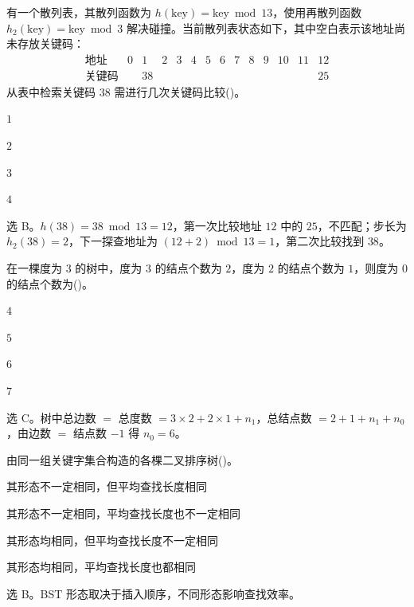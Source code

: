 \begin{question}
有一个散列表，其散列函数为 $h(\mathrm{key})=\mathrm{key}\bmod 13$，使用再散列函数 $h_2(\mathrm{key})=\mathrm{key}\bmod 3$ 解决碰撞。当前散列表状态如下，其中空白表示该地址尚未存放关键码：
\[
\begin{array}{c|ccccccccccccc}
\text{地址} &0&1&2&3&4&5&6&7&8&9&10&11&12\\ \hline
\text{关键码} &&38&&&&&&&&&&&25
\end{array}
\]
从表中检索关键码 $38$ 需进行几次关键码比较(\quad)。
\begin{choiceoptions}[1]
  \item $1$
  \item $2$
  \item $3$
  \item $4$
\end{choiceoptions}
\begin{solution}
选 B。$h(38)=38\bmod13=12$，第一次比较地址 $12$ 中的 $25$，不匹配；步长为 $h_2(38)=2$，下一探查地址为 $(12+2)\bmod13=1$，第二次比较找到 $38$。
\end{solution}
\end{question}


\begin{question}
在一棵度为 $3$ 的树中，度为 $3$ 的结点个数为 $2$，度为 $2$ 的结点个数为 $1$，则度为 $0$ 的结点个数为(\quad)。
\begin{choiceoptions}[2]
  \item $4$
  \item $5$
  \item $6$
  \item $7$
\end{choiceoptions}
\begin{solution}
选 C。树中总边数 $=$ 总度数 $=3\times2+2\times1+n_1$，总结点数 $=2+1+n_1+n_0$，由边数 $=$ 结点数 $-1$ 得 $n_0=6$。
\end{solution}
\end{question}

\begin{question}
由同一组关键字集合构造的各棵二叉排序树(\quad)。
\begin{choiceoptions}[2]
  \item 其形态不一定相同，但平均查找长度相同
  \item 其形态不一定相同，平均查找长度也不一定相同
  \item 其形态均相同，但平均查找长度不一定相同
  \item 其形态均相同，平均查找长度也都相同
\end{choiceoptions}
\begin{solution}
选 B。BST 形态取决于插入顺序，不同形态影响查找效率。
\end{solution}
\end{question}

